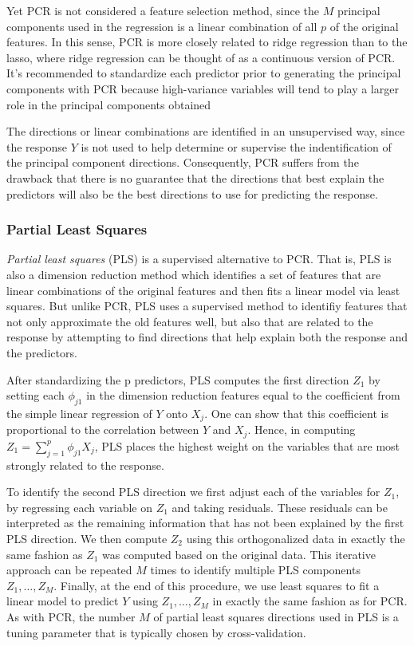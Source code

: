 \documentclass{article}
\numberwithin{equation}{section}
\begin{document}
\begin{enumerate}
Yet PCR is not considered a feature selection method, since the $M$ principal components used in the regression is a linear combination of all $p$ of the original features. In this sense, PCR is more closely related to ridge regression than to the lasso, where ridge regression can be thought of as a continuous version of PCR. It's recommended to standardize each predictor prior to generating the principal components with PCR because high-variance variables will tend to play a larger role in the principal components obtained

The directions or linear combinations are identified in an unsupervised way, since the response $Y$ is not used to help determine or supervise the indentification of the principal component directions. Consequently, PCR suffers from the drawback that there is no guarantee that the
directions that best explain the predictors will also be the best directions to use for predicting the response.

\subsubsection{Partial Least Squares}

\textit{Partial least squares} (PLS) is a supervised alternative to PCR. That is, PLS is also a dimension reduction method which identifies a set of features that are linear combinations of the original features and then fits a linear model via least squares. But unlike PCR, PLS uses a supervised method to identifiy features that not only approximate the old features well, but also that are related to the response by attempting to find directions that help explain both the response and the predictors.

After standardizing the p predictors,  PLS computes the first direction $Z_1$ by setting each $\phi_{j1}$ in the dimension reduction features equal to the coefficient from the simple linear regression of $Y$ onto $X_j$. One can show that this coefficient is proportional to the correlation between $Y$ and $X_j$. Hence, in computing $Z_1 = \sum_{j=1}^{p} \phi_{j1}X_j$, PLS places the highest weight on the variables that are most strongly related to the response.

To identify the second PLS direction we first adjust each of the variables for $Z_1$, by regressing each variable on $Z_1$ and taking residuals. These residuals can be interpreted as the remaining information that has not been explained by the first PLS direction. We then compute $Z_2$ using this orthogonalized data in exactly the same fashion as $Z_1$ was computed based on the original data. This iterative approach can be repeated $M$ times to identify multiple PLS components $Z_1,\dots,Z_M$. Finally, at the end of this procedure, we use least squares to fit a linear model to predict $Y$ using $Z_1,\dots,Z_M$ in exactly the same fashion as for PCR. As with PCR, the number $M$ of partial least squares directions used in
PLS is a tuning parameter that is typically chosen by cross-validation.


\end{enumerate}
\end{document}
